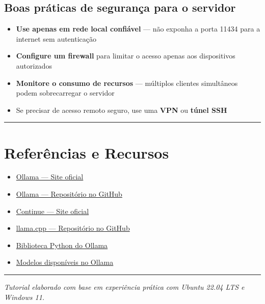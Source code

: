 \documentclass[
]{article}
\providecommand{\tightlist}{%
  \setlength{\itemsep}{0pt}\setlength{\parskip}{0pt}}
\begin{document}
\subsection{Boas práticas de segurança para o
servidor}\label{boas-pruxe1ticas-de-seguranuxe7a-para-o-servidor}

\begin{itemize}
\tightlist
\item
  \textbf{Use apenas em rede local confiável} --- não exponha a porta
  11434 para a internet sem autenticação
\item
  \textbf{Configure um firewall} para limitar o acesso apenas aos
  dispositivos autorizados
\item
  \textbf{Monitore o consumo de recursos} --- múltiplos clientes
  simultâneos podem sobrecarregar o servidor
\item
  Se precisar de acesso remoto seguro, use uma \textbf{VPN} ou
  \textbf{túnel SSH}
\end{itemize}

\begin{center}\rule{0.5\linewidth}{0.5pt}\end{center}

\section{Referências e Recursos}\label{referuxeancias-e-recursos}

\begin{itemize}
\tightlist
\item
  \href{https://ollama.com}{Ollama --- Site oficial}
\item
  \href{https://github.com/ollama/ollama}{Ollama --- Repositório no
  GitHub}
\item
  \href{https://continue.dev}{Continue --- Site oficial}
\item
  \href{https://github.com/ggerganov/llama.cpp}{llama.cpp ---
  Repositório no GitHub}
\item
  \href{https://github.com/ollama/ollama-python}{Biblioteca Python do
  Ollama}
\item
  \href{https://ollama.com/library}{Modelos disponíveis no Ollama}
\end{itemize}

\begin{center}\rule{0.5\linewidth}{0.5pt}\end{center}

\emph{Tutorial elaborado com base em experiência prática com Ubuntu
22.04 LTS e Windows 11.}
\end{document}
